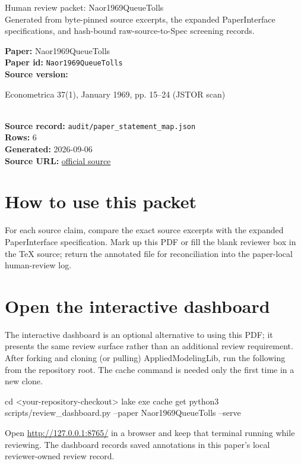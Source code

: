 \documentclass[10pt]{article}
\begin{document}
\fontsize{9}{10}\selectfont

\begin{center}
{\LARGE Human review packet: Naor1969QueueTolls}\\[0.35em]
\small Generated from byte-pinned source excerpts, the expanded PaperInterface
specifications, and hash-bound raw-source-to-Spec screening records.
\end{center}

\noindent\textbf{Paper:} Naor1969QueueTolls\\
\textbf{Paper id:} \texttt{Naor1969QueueTolls}\\
\textbf{Source version:} \parbox[t]{0.76\linewidth}{\raggedright Econometrica 37(1), January 1969, pp. 15–24 (JSTOR scan)}\\
\textbf{Source record:} \texttt{audit/paper\_statement\_map.json}\\
\textbf{Rows:} 6\\
\textbf{Generated:} 2026-09-06\\
\textbf{Source URL:} \href{https://www.jstor.org/stable/1909200}{official source}





\section*{How to use this packet}
For each source claim, compare the exact source excerpts with the expanded
PaperInterface specification. Mark up this PDF or fill the blank reviewer box in the TeX source;
return the annotated file for reconciliation into the paper-local human-review
log.

\section*{Open the interactive dashboard}
The interactive dashboard is an optional alternative to using this PDF; it
presents the same review surface rather than an additional review requirement.
After forking and cloning (or pulling) AppliedModelingLib, run the following from the
repository root. The cache command is needed only the first time in a new clone.
\begin{ReviewVerbatim}
cd <your-repository-checkout>
lake exe cache get
python3 scripts/review_dashboard.py --paper Naor1969QueueTolls --serve
\end{ReviewVerbatim}
Open \url{http://127.0.0.1:8765/} in a browser and keep that terminal running
while reviewing. The dashboard records saved annotations in this paper's local
reviewer-owned review record.
\end{document}
